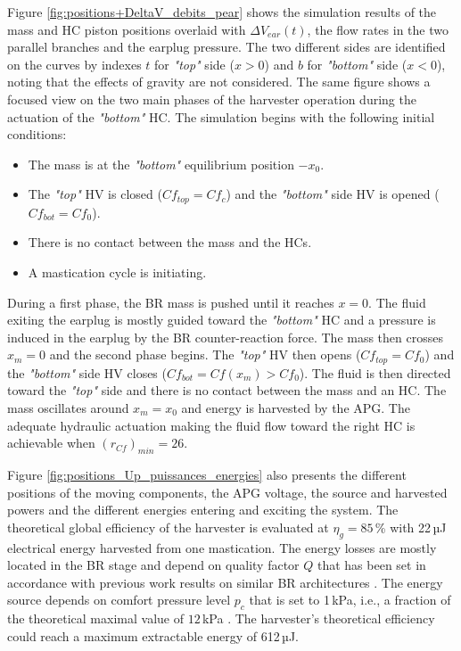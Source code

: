 \documentclass[3p,twocolumn,preprint]{elsarticle}
\begin{document}
Figure \ref{fig:positions+DeltaV_debits_pear} shows the simulation results of the mass and HC piston positions overlaid with $\Delta V_{ear}(t)$, the flow rates in the two parallel branches and the earplug pressure. The two different sides are identified on the curves by indexes $t$ for \emph{"top"} side ($x>0$) and $b$ for \emph{"bottom"} side ($x<0$), noting that the effects of gravity are not considered. The same figure shows a focused view on the two main phases of the harvester operation during the actuation of the \emph{"bottom"} HC. The simulation begins with the following initial conditions:
\begin{itemize}
	\item The mass is at the \emph{"bottom"} equilibrium position $-x_0$.
	\item The \emph{"top"} HV is closed ($Cf_{top} = Cf_c$) and the \emph{"bottom"} side HV is opened ($Cf_{bot} = Cf_0$).
	\item There is no contact between the mass and the HCs.
	\item A mastication cycle is initiating.
\end{itemize}

During a first phase, the BR mass is pushed until it reaches $x=0$. The fluid exiting the earplug is mostly guided toward the \emph{"bottom"} HC and a pressure is induced in the earplug by the BR counter-reaction force. The mass then crosses $x_m=0$ and the second phase begins. The \emph{"top"} HV then opens ($Cf_{top} = Cf_0$) and the \emph{"bottom"} side HV closes ($Cf_{bot} = Cf(x_m)>Cf_0$). The fluid is then directed toward the \emph{"top"} side and there is no contact between the mass and an HC. The mass oscillates around $x_m=x_0$ and energy is harvested by the APG. The adequate hydraulic actuation making the fluid flow toward the right HC is achievable when \mbox{$(r_{Cf})_{min}=26$}.  

Figure \ref{fig:positions_Up_puissances_energies} also presents the different positions of the moving components, the APG voltage, the source and harvested powers and the different energies entering and exciting the system. The theoretical global efficiency of the harvester is evaluated at \mbox{$\eta_g=85$\,\%} with 22\,µJ electrical energy harvested from one mastication. The energy losses are mostly located in the BR stage and depend on quality factor $Q$ that has been set in accordance with previous work results on similar BR architectures \cite{Liu2013}. The energy source depends on comfort pressure level $p_c$ that is set to 1\,kPa, i.e., a fraction of the theoretical maximal value of $12$\,kPa \cite{Bouchard-Roy2020}. The harvester's theoretical efficiency could reach a maximum extractable energy of 612\,µJ.
\end{document}
